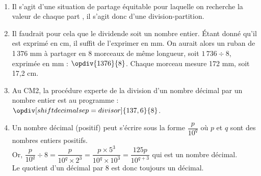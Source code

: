 \ \\ [-5mm]
\begin{enumerate}
   \item Il s'agit d'une situation de partage équitable pour laquelle on recherche \og la valeur de chaque part \fg, il s'agit donc d'une division-partition.
   \item Il faudrait pour cela que le dividende soit un nombre entier. Étant donné qu'il est exprimé en cm, il suffit de l'exprimer en mm. On aurait alors un ruban de 1\,376 mm à partager en 8 morceaux de même longueur, soit $1\,736\div8$, exprimée en mm : $\opdiv{1376}{8}$. \quad Chaque morceau mesure 172 mm, soit 17,2 cm.
   \item Au CM2, la procédure experte de la division d'un nombre décimal par un nombre entier est au programme :
   $\opdiv[shiftdecimalsep=divisor]{137,6}{8}$.
   \item Un nombre décimal (positif) peut s'écrire sous la forme $\dfrac{p}{10^q}$ où $p$ et $q$ sont des nombres entiers positifs. \\
   Or, $\dfrac{p}{10^q}\div8 =\dfrac{p}{10^q\times2^3} =\dfrac{p\times5^3}{10^{q}\times10^3} =\dfrac{125p}{10^{q+3}}$ qui est un nombre décimal. \\ [1mm]
   Le quotient d'un décimal par 8 est donc toujours un décimal.
\end{enumerate}
